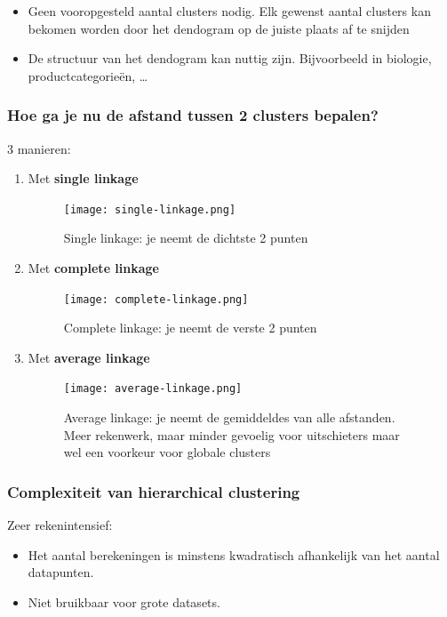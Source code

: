 \documentclass{article}
\begin{document}
\begin{itemize}
    \item Geen vooropgesteld aantal clusters nodig. Elk gewenst aantal clusters kan bekomen worden door het dendogram op de juiste plaats af te snijden
    \item De structuur van het dendogram kan nuttig zijn. Bijvoorbeeld in biologie, productcategorieën, \dots
\end{itemize}

\subsubsection{Hoe ga je nu de afstand tussen 2 clusters bepalen?}

3 manieren:

\begin{enumerate}
    \item Met \textbf{single linkage}
    \begin{figure}[H]
        \centering
        \texttt{[image: single-linkage.png]}
        \caption{Single linkage: je neemt de dichtste 2 punten}
    \end{figure}
    \item Met \textbf{complete linkage}
    \begin{figure}[H]
        \centering
        \texttt{[image: complete-linkage.png]}
        \caption{Complete linkage: je neemt de verste 2 punten}
    \end{figure}
    \item Met \textbf{average linkage}
    \begin{figure}[H]
        \centering
        \texttt{[image: average-linkage.png]}
        \caption{Average linkage: je neemt de gemiddeldes van alle afstanden. Meer rekenwerk, maar minder gevoelig voor uitschieters maar wel een voorkeur voor globale clusters}
    \end{figure}
\end{enumerate}

\subsubsection{Complexiteit van hierarchical clustering}

Zeer rekenintensief:

\begin{itemize}
    \item Het aantal berekeningen is minstens kwadratisch afhankelijk van het aantal datapunten.
    \item Niet bruikbaar voor grote datasets.
\end{itemize}
\end{document}
